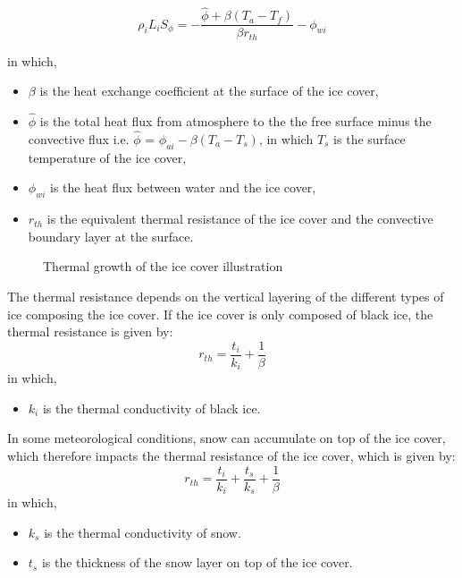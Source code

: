 \begin{equation} \label{eq:ice_snow}
\rho_i L_i S_{\phi} = - \dfrac{\hat{\phi} + \beta (T_a-T_f) }{\beta r_{th}}  -\phi_{wi}
\end{equation}

in which,
\begin{itemize}
    \item $\beta$ is the heat exchange coefficient at the surface of the ice cover,
    \item $\hat{\phi}$ is the total heat flux from atmosphere to the the free surface minus the convective flux i.e. $\hat{\phi}$ = $\phi_{ai} - \beta (T_a-T_s)$, in which $T_s$ is the surface temperature of the ice cover,
    \item $\phi_{wi}$ is the heat flux between water and the ice cover,
    \item $r_{th}$ is the equivalent thermal resistance of the ice cover and the convective boundary layer at the surface.
\end{itemize}

\begin{figure}[H]
    \begin{center}
    \end{center}
    \caption{Thermal growth of the ice cover illustration}
    \label{fig:icover_growth}
\end{figure}

The thermal resistance depends on the vertical layering of the different types of ice composing the ice cover. If the ice cover is only composed of black ice, the thermal resistance is given by:
\begin{equation} \label{eq:icover_thermal_resistance}
r_{th} = \dfrac{t_i}{k_i} + \dfrac{1}{\beta}
\end{equation}
in which,
\begin{itemize}
    \item $k_i$ is the thermal conductivity of black ice.
\end{itemize}

In some meteorological conditions, snow can accumulate on top of the ice cover, which therefore impacts
the thermal resistance of the ice cover, which is given by:
\begin{equation} \label{eq:icover_thermal_resistance}
r_{th} = \dfrac{t_i}{k_i} + \dfrac{t_s}{k_s} + \dfrac{1}{\beta}
\end{equation}
in which,
\begin{itemize}
    \item $k_s$ is the thermal conductivity of snow.
    \item $t_s$ is the thickness of the snow layer on top of the ice cover.
\end{itemize}

